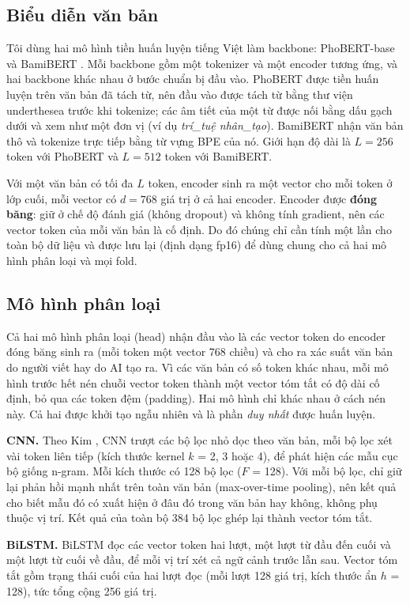 \documentclass[conference,a4paper]{IEEEtran}
\begin{document}
\subsection{Biểu diễn văn bản}
Tôi dùng hai mô hình tiền huấn luyện tiếng Việt làm backbone: PhoBERT-base \cite{phobert} và BamiBERT \cite{bamibert}. Mỗi backbone gồm một tokenizer và một encoder tương ứng, và hai backbone khác nhau ở bước chuẩn bị đầu vào. PhoBERT được tiền huấn luyện trên văn bản đã tách từ, nên đầu vào được tách từ bằng thư viện underthesea \cite{underthesea} trước khi tokenize; các âm tiết của một từ được nối bằng dấu gạch dưới và xem như một đơn vị (ví dụ \emph{trí\_tuệ nhân\_tạo}). BamiBERT nhận văn bản thô và tokenize trực tiếp bằng từ vựng BPE của nó. Giới hạn độ dài là $L = 256$ token với PhoBERT và $L = 512$ token với BamiBERT.

Với một văn bản có tối đa $L$ token, encoder sinh ra một vector cho mỗi token ở lớp cuối, mỗi vector có $d = 768$ giá trị ở cả hai encoder. Encoder được \textbf{đóng băng}: giữ ở chế độ đánh giá (không dropout) và không tính gradient, nên các vector token của mỗi văn bản là cố định. Do đó chúng chỉ cần tính một lần cho toàn bộ dữ liệu và được lưu lại (định dạng fp16) để dùng chung cho cả hai mô hình phân loại và mọi fold.

\subsection{Mô hình phân loại}
Cả hai mô hình phân loại (head) nhận đầu vào là các vector token do encoder đóng băng sinh ra (mỗi token một vector 768 chiều) và cho ra xác suất văn bản do người viết hay do AI tạo ra. Vì các văn bản có số token khác nhau, mỗi mô hình trước hết nén chuỗi vector token thành một vector tóm tắt có độ dài cố định, bỏ qua các token đệm (padding). Hai mô hình chỉ khác nhau ở cách nén này. Cả hai được khởi tạo ngẫu nhiên và là phần \emph{duy nhất} được huấn luyện.

\textbf{CNN.} Theo Kim \cite{kim2014}, CNN trượt các bộ lọc nhỏ dọc theo văn bản, mỗi bộ lọc xét vài token liên tiếp (kích thước kernel $k$ = 2, 3 hoặc 4), để phát hiện các mẫu cục bộ giống n-gram. Mỗi kích thước có 128 bộ lọc ($F$ = 128). Với mỗi bộ lọc, chỉ giữ lại phản hồi mạnh nhất trên toàn văn bản (max-over-time pooling), nên kết quả cho biết mẫu đó có xuất hiện ở đâu đó trong văn bản hay không, không phụ thuộc vị trí. Kết quả của toàn bộ 384 bộ lọc ghép lại thành vector tóm tắt.

\textbf{BiLSTM.} BiLSTM \cite{lstm,bilstm} đọc các vector token hai lượt, một lượt từ đầu đến cuối và một lượt từ cuối về đầu, để mỗi vị trí xét cả ngữ cảnh trước lẫn sau. Vector tóm tắt gồm trạng thái cuối của hai lượt đọc (mỗi lượt 128 giá trị, kích thước ẩn $h$ = 128), tức tổng cộng 256 giá trị.
\end{document}
